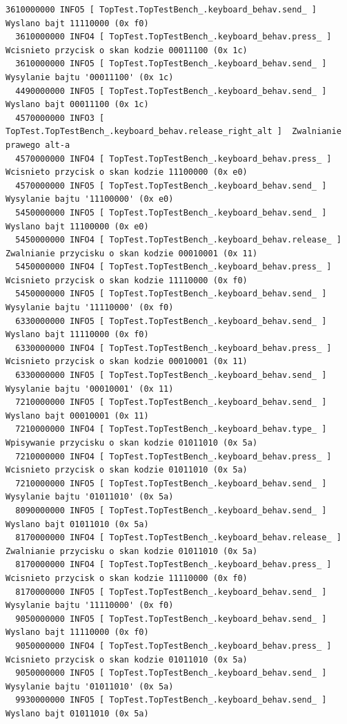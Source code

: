 \documentclass[a4paper,12pt]{article}
\begin{document}
\begin{lstlisting}[label=Keyboard_output,caption=Keyboard logs output]
  3610000000 INFO5 [ TopTest.TopTestBench_.keyboard_behav.send_ ]  Wyslano bajt 11110000 (0x f0)
  3610000000 INFO4 [ TopTest.TopTestBench_.keyboard_behav.press_ ]  Wcisnieto przycisk o skan kodzie 00011100 (0x 1c)
  3610000000 INFO5 [ TopTest.TopTestBench_.keyboard_behav.send_ ]  Wysylanie bajtu '00011100' (0x 1c)
  4490000000 INFO5 [ TopTest.TopTestBench_.keyboard_behav.send_ ]  Wyslano bajt 00011100 (0x 1c)
  4570000000 INFO3 [ TopTest.TopTestBench_.keyboard_behav.release_right_alt ]  Zwalnianie prawego alt-a
  4570000000 INFO4 [ TopTest.TopTestBench_.keyboard_behav.press_ ]  Wcisnieto przycisk o skan kodzie 11100000 (0x e0)
  4570000000 INFO5 [ TopTest.TopTestBench_.keyboard_behav.send_ ]  Wysylanie bajtu '11100000' (0x e0)
  5450000000 INFO5 [ TopTest.TopTestBench_.keyboard_behav.send_ ]  Wyslano bajt 11100000 (0x e0)
  5450000000 INFO4 [ TopTest.TopTestBench_.keyboard_behav.release_ ]  Zwalnianie przycisku o skan kodzie 00010001 (0x 11)
  5450000000 INFO4 [ TopTest.TopTestBench_.keyboard_behav.press_ ]  Wcisnieto przycisk o skan kodzie 11110000 (0x f0)
  5450000000 INFO5 [ TopTest.TopTestBench_.keyboard_behav.send_ ]  Wysylanie bajtu '11110000' (0x f0)
  6330000000 INFO5 [ TopTest.TopTestBench_.keyboard_behav.send_ ]  Wyslano bajt 11110000 (0x f0)
  6330000000 INFO4 [ TopTest.TopTestBench_.keyboard_behav.press_ ]  Wcisnieto przycisk o skan kodzie 00010001 (0x 11)
  6330000000 INFO5 [ TopTest.TopTestBench_.keyboard_behav.send_ ]  Wysylanie bajtu '00010001' (0x 11)
  7210000000 INFO5 [ TopTest.TopTestBench_.keyboard_behav.send_ ]  Wyslano bajt 00010001 (0x 11)
  7210000000 INFO4 [ TopTest.TopTestBench_.keyboard_behav.type_ ]  Wpisywanie przycisku o skan kodzie 01011010 (0x 5a)
  7210000000 INFO4 [ TopTest.TopTestBench_.keyboard_behav.press_ ]  Wcisnieto przycisk o skan kodzie 01011010 (0x 5a)
  7210000000 INFO5 [ TopTest.TopTestBench_.keyboard_behav.send_ ]  Wysylanie bajtu '01011010' (0x 5a)
  8090000000 INFO5 [ TopTest.TopTestBench_.keyboard_behav.send_ ]  Wyslano bajt 01011010 (0x 5a)
  8170000000 INFO4 [ TopTest.TopTestBench_.keyboard_behav.release_ ]  Zwalnianie przycisku o skan kodzie 01011010 (0x 5a)
  8170000000 INFO4 [ TopTest.TopTestBench_.keyboard_behav.press_ ]  Wcisnieto przycisk o skan kodzie 11110000 (0x f0)
  8170000000 INFO5 [ TopTest.TopTestBench_.keyboard_behav.send_ ]  Wysylanie bajtu '11110000' (0x f0)
  9050000000 INFO5 [ TopTest.TopTestBench_.keyboard_behav.send_ ]  Wyslano bajt 11110000 (0x f0)
  9050000000 INFO4 [ TopTest.TopTestBench_.keyboard_behav.press_ ]  Wcisnieto przycisk o skan kodzie 01011010 (0x 5a)
  9050000000 INFO5 [ TopTest.TopTestBench_.keyboard_behav.send_ ]  Wysylanie bajtu '01011010' (0x 5a)
  9930000000 INFO5 [ TopTest.TopTestBench_.keyboard_behav.send_ ]  Wyslano bajt 01011010 (0x 5a)
\end{lstlisting}
\end{document}
